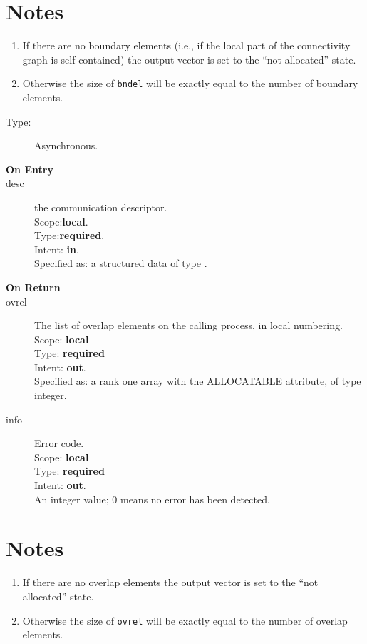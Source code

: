 \section*{Notes}
\begin{enumerate}
\item If there are no boundary elements (i.e., if the local part of
  the connectivity graph is self-contained) the output vector is set
  to the ``not allocated'' state. 
\item Otherwise the size of \verb|bndel| will be exactly equal to the
  number of boundary elements. 
\end{enumerate}



\begin{description}
\item[Type:] Asynchronous.
\item[\bf On Entry]
\item[desc] the communication descriptor.\\
Scope:{\bf local}.\\
Type:{\bf required}.\\
Intent: {\bf in}.\\
Specified as: a structured data of type \descdata.
\end{description}

\begin{description}
\item[\bf On Return]
\item[ovrel] The list of overlap elements on the calling process, in
  local numbering.\\
Scope: {\bf local} \\
Type: {\bf required}\\
Intent: {\bf out}.\\
Specified as: a rank one array with the ALLOCATABLE
attribute, of type integer.\\
\item[info] Error code.\\
Scope: {\bf local} \\
Type: {\bf required} \\
Intent: {\bf out}.\\
An integer value; 0 means no error has been detected. 
\end{description}

\section*{Notes}
\begin{enumerate}
\item If there are no overlap elements the output vector is set
  to the ``not allocated'' state.  
\item Otherwise the size of \verb|ovrel| will be exactly equal to the
  number of overlap elements. 
\end{enumerate}



